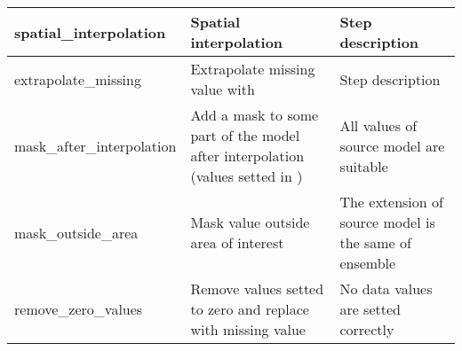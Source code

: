 \documentclass[letterpaper,10pt,english]{sphinxmanual}
\begin{document}
\begin{savenotes}
\begin{tabulary}{\linewidth}[t]{|T|T|T|}
\hline
spatial\_interpolation
&
Spatial interpolation
&
Step description
\\
\hline
extrapolate\_missing
&
Extrapolate missing value with 
&
Step description
\\
\hline
mask\_after\_interpolation
&
Add a mask to some part of the model after interpolation (values setted in {\hyperref[\detokenize{configuration/index:src-config}]{}})
&
All values of source model are suitable
\\
\hline
mask\_outside\_area
&
Mask value outside area of interest
&
The extension of source model is the same of ensemble
\\
\hline
remove\_zero\_values
&
Remove values setted to zero and replace with missing value
&
No data values are setted correctly
\\
\hline
\end{tabulary}
\par
\sphinxattableend\end{savenotes}



\renewcommand{\indexname}{Index}
\printindex
\end{document}
